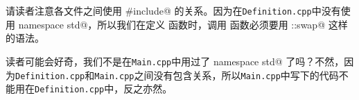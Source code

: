 请读者注意各文件之间使用 \lstinline@#include@ 的关系。因为在\texttt{Definition.cpp}中没有使用 \lstinline@using namespace std@，所以我们在定义 \lstinline@transfer@ 函数时，调用 \lstinline@swap@ 函数必须要用 \lstinline@std::swap@ 这样的语法。\par
读者可能会好奇，我们不是在\texttt{Main.cpp}中用过了 \lstinline@using namespace std@ 了吗？不然，因为\texttt{Definition.cpp}和\texttt{Main.cpp}之间没有包含关系，所以\texttt{Main.cpp}中写下的代码不能用在\texttt{Definition.cpp}中，反之亦然。\par
